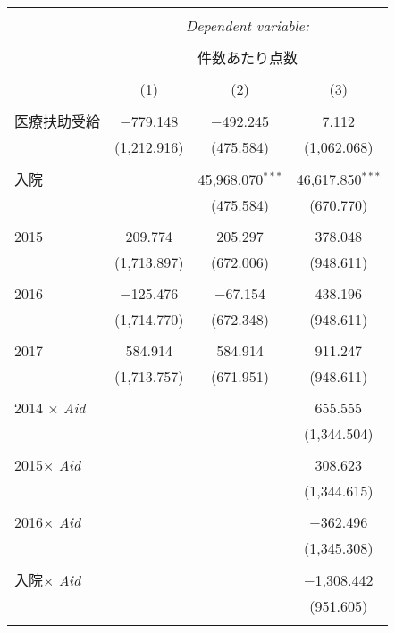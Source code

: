 \documentclass{jsarticle}
\begin{document}
\begin{table}[!htbp] \centering 
  \caption{} 
  \label{} 
  \small
\begin{tabular}{@{\extracolsep{5pt}}lccc} 
\\[-1.8ex]\hline 
\hline \\[-1.8ex] 
 & \multicolumn{3}{c}{\textit{Dependent variable:}} \\ 
\cline{2-4} 
\\[-1.8ex] & \multicolumn{3}{c}{件数あたり点数} \\ 
\\[-1.8ex] & (1) & (2) & (3)\\ 
\hline \\[-1.8ex] 
 医療扶助受給 & $-$779.148 & $-$492.245 & 7.112 \\ 
  & (1,212.916) & (475.584) & (1,062.068) \\ 
  & & & \\ 
 入院 &  & 45,968.070$^{***}$ & 46,617.850$^{***}$ \\ 
  &  & (475.584) & (670.770) \\ 
  & & & \\ 
 2015 & 209.774 & 205.297 & 378.048 \\ 
  & (1,713.897) & (672.006) & (948.611) \\ 
  & & & \\ 
 2016 & $-$125.476 & $-$67.154 & 438.196 \\ 
  & (1,714.770) & (672.348) & (948.611) \\ 
  & & & \\ 
 2017 & 584.914 & 584.914 & 911.247 \\ 
  & (1,713.757) & (671.951) & (948.611) \\ 
  & & & \\ 
 2014 $\times$ \textit{Aid} &  &  & 655.555 \\ 
  &  &  & (1,344.504) \\ 
  & & & \\ 
 2015$\times$ \textit{Aid} &  &  & 308.623 \\ 
  &  &  & (1,344.615) \\ 
  & & & \\ 
 2016$\times$ \textit{Aid} &  &  & $-$362.496 \\ 
  &  &  & (1,345.308) \\ 
  & & & \\ 
 入院$\times$ \textit{Aid} &  &  & $-$1,308.442 \\ 
  &  &  & (951.605) \\ 
  & & & \\ 

\end{tabular}
\end{table}
\end{document}
